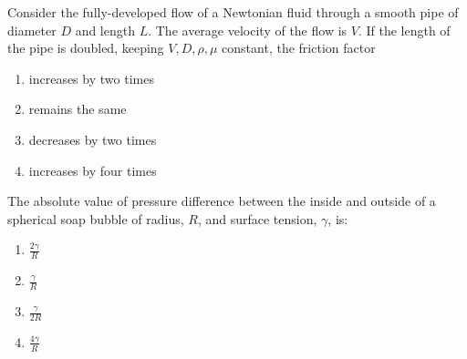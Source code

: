 \item Consider the fully-developed flow of a Newtonian fluid  through a smooth pipe of diameter $D$ and length $L$. The average velocity of the flow is $V$. If the length of the pipe is doubled, keeping $V,D,\rho,\mu$ constant, the friction factor
\begin{enumerate}
   \item increases by two times
   \item remains the same  
   \item decreases by two times
   \item increases by four times
\end{enumerate}
\item The absolute value of pressure difference between the inside and outside of a spherical soap bubble of radius, $R$, and surface tension, $\gamma$, is:
\begin{enumerate}
   \item $\frac{2\gamma}{R}$
   \item $\frac{\gamma}{R}$
   \item $\frac{\gamma}{2R}$
   \item $\frac{4\gamma}{R}$
\end{enumerate}
